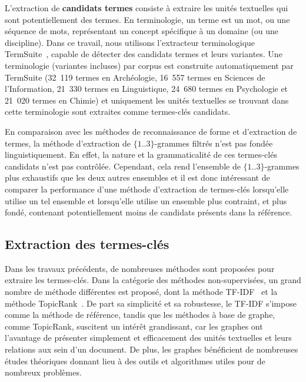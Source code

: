     L'extraction de \textbf{candidats termes} consiste à extraire les unités
    textuelles qui sont potentiellement des termes. En terminologie, un terme
    est un mot, ou une séquence de mots, représentant un concept spécifique à un
    domaine (ou une discipline). Dans ce travail, nous utilisons l'extracteur
    terminologique TermSuite~\cite{rocheteau2011termsuite}, capable de détecter
    des candidats termes et leurs variantes. Une terminologie (variantes
    incluses) par corpus est construite automatiquement par TermSuite (32~119
    termes en Archéologie, 16~557 termes en Sciences de l'Information, 21~330
    termes en Linguistique, 24~680 termes en Psychologie et 21~020 termes en
    Chimie) et uniquement les unités textuelles se trouvant dans cette
    terminologie sont extraites comme termes-clés candidats.
    
    En comparaison avec les méthodes de reconnaissance de forme et d'extraction
    de termes, la méthode d'extraction de $\{1..3\}$-grammes filtrés n'est pas
    fondée linguistiquement. En effet, la nature et la grammaticalité de ces
    termes-clés candidats n'est pas contrôlée. Cependant, cela rend l'ensemble
    de $\{1..3\}$-grammes plus exhaustifs que les deux autres ensembles et il
    est donc intéressant de comparer la performance d'une méthode d'extraction
    de termes-clés lorsqu'elle utilise un tel ensemble et lorsqu'elle utilise un
    ensemble plus contraint, et plus fondé, contenant potentiellement moins de
    candidats présents dans la référence.

  \subsection{Extraction des termes-clés}
  \label{subsec:extraction_de_termes_cles}
    Dans les travaux précédents, de nombreuses méthodes sont proposées pour
    extraire les termes-clés. Dans la catégorie des méthodes non-supervisées, un
    grand nombre de méthode différentes est proposé, dont la méthode
    TF-IDF~\cite{jones1972tfidf} et la méthode
    TopicRank~\cite{bougouin2013topicrank}. De part sa simplicité et sa
    robustesse, le TF-IDF s'impose comme la méthode de référence, tandis que les
    méthodes à base de graphe, comme TopicRank, suscitent un intérêt
    grandissant, car les graphes ont l'avantage de présenter simplement et
    efficacement des unités textuelles et leurs relations aux sein d'un
    document. De plus, les graphes bénéficient de nombreuses études théoriques
    donnant lieu à des outils et algorithmes utiles pour de nombreux problèmes.

